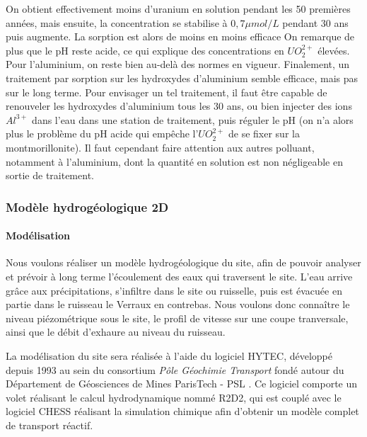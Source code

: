 \documentclass{article}
\begin{document}
On obtient effectivement moins d’uranium en solution pendant les 50 premières années, mais ensuite, la concentration se stabilise à $0,7 \mu mol/L$ pendant 30 ans puis augmente. La sorption est alors de moins en moins efficace On remarque de plus que le pH reste acide, ce qui explique des concentrations en $UO_2^{2+}$ élevées. Pour l’aluminium, on reste bien au-delà des normes en vigueur.
Finalement, un traitement par sorption sur les hydroxydes d’aluminium semble efficace, mais pas sur le long terme. Pour envisager un tel traitement, il faut être capable de renouveler les hydroxydes d’aluminium tous les 30 ans, ou bien injecter des ions $Al^{3+}$ dans l’eau dans une station de traitement, puis réguler le pH (on n’a alors plus le problème du pH acide qui empêche l’$UO_2^{2+}$ de se fixer sur la montmorillonite). Il faut cependant faire attention aux autres polluant, notamment à l’aluminium, dont la quantité en solution est non négligeable en sortie de traitement.




\subsubsection{Modèle hydrogéologique 2D}
\paragraph{Modélisation}
Nous voulons réaliser un modèle hydrogéologique du site, afin de pouvoir analyser et prévoir à long terme l'écoulement des eaux qui traversent le site. L'eau arrive grâce aux précipitations, s'infiltre dans le site ou ruisselle, puis est évacuée en partie dans le ruisseau le Verraux en contrebas. Nous voulons donc connaître le niveau piézométrique sous le site, le profil de vitesse sur une coupe tranversale, ainsi que le débit d'exhaure au niveau du ruisseau.

La modélisation du site sera réalisée à l'aide du logiciel HYTEC, développé depuis 1993 au sein du consortium \emph{Pôle Géochimie Transport} fondé autour du Département de Géosciences de Mines ParisTech - PSL \cite{site_hytec_hydrodynamique_nodate}. 
Ce logiciel comporte un volet réalisant le calcul hydrodynamique nommé R2D2, qui est couplé avec le logiciel CHESS réalisant la simulation chimique \cite{lagneau:hal-00614306} afin d'obtenir un modèle complet de transport réactif. 
\end{document}
